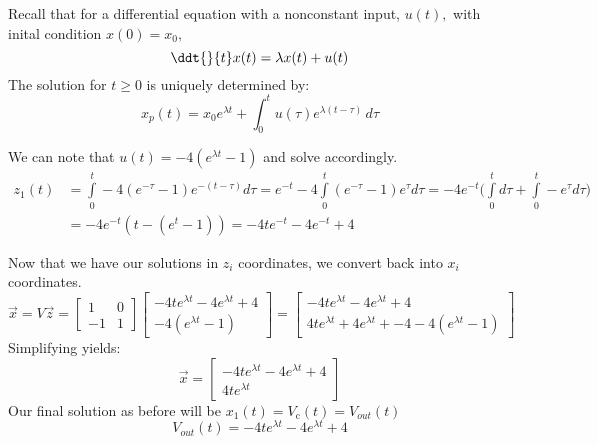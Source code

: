 {  Recall that for a differential equation with a nonconstant input, $u(t),$ with inital condition $x(0) = x_{0},$
  \begin{equation}
    \ddt{}{t} x(t) = \lambda x(t) + u(t)
  \end{equation}
  The solution for $t \geq 0$ is uniquely determined by:
  \begin{equation}
    x_{p}(t) = x_{0}e^{\lambda{}t} + \int_0^t \! u(\tau{})e^{\lambda{}(t - \tau{})} \, d\tau{}
  \end{equation}

  We can note that $u(t) = -4(e^{\lambda t} - 1)$ and solve accordingly.
  \begin{align*}
  z_{1}(t) &= \int\limits_{0}^t -4 (e^{- \tau} - 1) e^{-(t - \tau)} d\tau = 
  e^{-t} -4 \int\limits_{0}^t (e^{- \tau} - 1) e^{\tau} d\tau 
  = -4e^{-t} \big(\int\limits_{0}^t d\tau + \int\limits_{0}^t -e^{\tau} d\tau \big) \\
  &= -4e^{-t} (t -(e^{t} - 1)) = -4t e^{-t} - 4 e^{-t} + 4
  \end{align*}

  Now that we have our solutions in $z_i$ coordinates, we convert back into $x_i$ coordinates.
  $$\vec{x} = V \vec{z} = \begin{bmatrix} 1 & 0 \\ -1 & 1 \end{bmatrix} 
  \begin{bmatrix} -4 t e^{\lambda t} - 4 e^{\lambda t} + 4 \\ -4 (e^{\lambda t} - 1) \end{bmatrix}
  = \begin{bmatrix} -4 t e^{\lambda t} - 4 e^{\lambda t} + 4 \\ 4t e^{\lambda t} + 4e^{\lambda t} + -4 -4(e^{\lambda t} - 1) \end{bmatrix}$$
  Simplifying yields:
  $$\vec{x} = \begin{bmatrix} -4 t e^{\lambda t} - 4 e^{\lambda t} + 4 \\ 4 t e^{\lambda t} \end{bmatrix}$$
  Our final solution as before will be $x_{1}(t) = V_{\text{c}}(t) = V_{out}(t)$
  $$V_{out}(t) = -4 t e^{\lambda t} - 4 e^{\lambda t} + 4$$\

}
